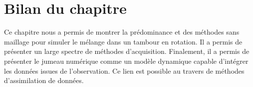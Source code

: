 \section{Bilan du chapitre}

Ce chapitre nous a permis de montrer la prédominance et des méthodes sans maillage pour simuler le mélange dans un tambour en rotation. Il a permis de présenter un large spectre de méthodes d'acquisition. Finalement, il a permis de présenter le jumeau numérique comme un modèle dynamique capable d'intégrer les données issues de l'observation. Ce lien est possible au travers de méthodes d'assimilation de données.




